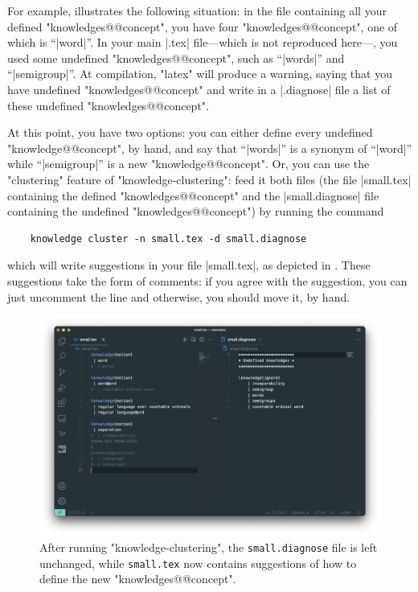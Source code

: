 \documentclass{article}
\begin{document}
For example,  illustrates the following situation:
in the file containing all your defined "knowledges@@concept", you have
four "knowledges@@concept", one of which is ``\spverb|word|''.
In your main \spverb|.tex| file---which is not reproduced here---, you used some 
undefined "knowledges@@concept", such as ``\spverb|words|'' and
``\spverb|semigroup|''.
At compilation, "latex" will produce a warning, saying that you have undefined
"knowledges@@concept" and write in a \spverb|.diagnose| file a list
of these undefined "knowledges@@concept".

At this point, you have two options: you can either define every undefined "knowledge@@concept", by hand, and say that ``\spverb|words|'' is a synonym of
``\spverb|word|'' while ``\spverb|semigroup|'' is a new "knowledge@@concept".
Or, you can use the "clustering" feature of "knowledge-clustering": feed
it both files (the file \spverb|small.tex| containing the defined 
"knowledges@@concept" and
the \spverb|small.diagnose| file containing the undefined "knowledges@@concept")
by running the command
\begin{verbatim}
    knowledge cluster -n small.tex -d small.diagnose
\end{verbatim}
which will write suggestions in your file \spverb|small.tex|,
as depicted in . These suggestions
take the form of comments: if you agree with the suggestion, you can just
uncomment the line and otherwise, you should move it, by hand.

\begin{figure}[htb]
    \centering
    \includegraphics[width=.95\textwidth]{img/small-after.png}
    \caption{%
        \label{fig:clustering-after}
        After running "knowledge-clustering", the \texttt{small.diagnose} file
        is left unchanged, while \texttt{small.tex} now contains suggestions
        of how to define the new "knowledges@@concept".
     }
\end{figure}
\end{document}
